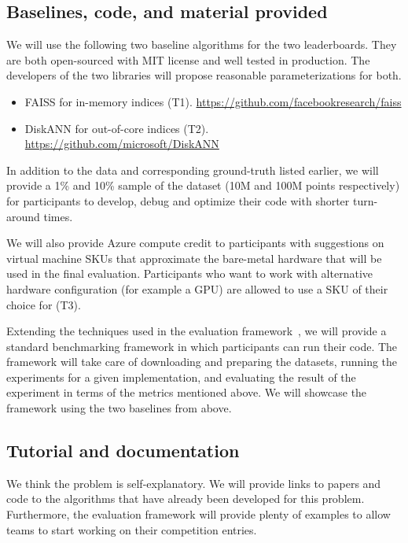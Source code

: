 \subsection{Baselines, code, and material provided}

We will use the following two baseline algorithms for the two
leaderboards.  They are both open-sourced with MIT license and well
tested in production.
The developers of the two libraries will propose reasonable parameterizations for both.
\begin{itemize}
  \item FAISS for in-memory indices (T1). 
    \url{https://github.com/facebookresearch/faiss}
  \item DiskANN for out-of-core indices (T2).
    \url{https://github.com/microsoft/DiskANN}
\end{itemize}


In addition to the data and corresponding ground-truth listed earlier,
we will provide a 1\% and 10\% sample of the dataset (10M and
100M points respectively) for participants to develop, debug and
optimize their code with shorter turn-around times.

We will also provide Azure compute credit to participants with
suggestions on virtual machine SKUs that approximate the bare-metal
hardware that will be used in the final evaluation.  Participants who
want to work with alternative hardware configuration (for example a
GPU) are allowed to use a SKU of their choice for (T3).

Extending the techniques used in the evaluation framework~\cite{Benchmark}, 
we will provide a standard benchmarking framework in which participants can 
run their code.
The framework will take care of downloading and preparing the datasets,
running the experiments for a given implementation, 
and evaluating the result of the experiment in terms of the metrics mentioned above.
We will showcase the framework using the two baselines from above.




\subsection{Tutorial and documentation}

We think the problem is self-explanatory. We will provide links to
papers and code to the algorithms that have already been developed for this
problem. Furthermore, the evaluation framework will provide plenty 
of examples to allow teams to start working on their competition entries.



